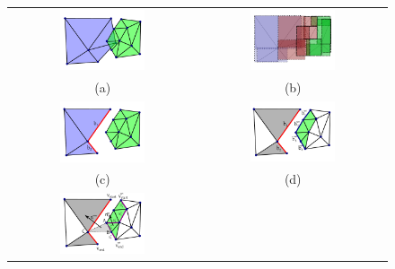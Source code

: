 \begin{figure}[tpb]
\centering
\setlength{\tabcolsep}{1px}
\begin{tabular}{cc}
\includegraphics[width=0.475\textwidth]{./img/ch-incr-dens/meshmerge01new}&
\includegraphics[width=0.475\textwidth]{./img/ch-incr-dens/meshmerge02new}\\
(a)&(b)\\
\includegraphics[width=0.475\textwidth]{./img/ch-incr-dens/meshmerge03new}&
\includegraphics[width=0.475\textwidth]{./img/ch-incr-dens/meshmerge04new}\\
(c)&(d)\\
\includegraphics[width=0.475\textwidth]{./img/ch-incr-dens/meshmerge05new}&

\end{tabular}
\end{figure}
